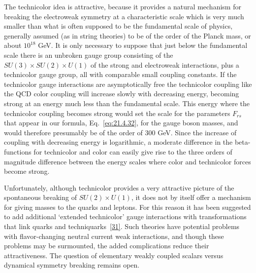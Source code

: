 The technicolor idea is attractive, because it provides a natural mechanism for breaking the electroweak symmetry at a characteristic scale which is very much smaller than what is often supposed to be the fundamental scale of physics, generally assumed (as in string theories) to be of the order of the Planck mass, or about $10^{18}$ GeV. It is only necessary to suppose that just below the fundamental scale there is an unbroken gauge group consisting of the $SU(3)\times SU(2)\times U(1)$ of the strong and electroweak interactions, plus a technicolor gauge group, all with comparable small coupling constants. If the technicolor gauge interactions are asymptotically free the technicolor coupling like the QCD color coupling will increase slowly with decreasing energy, becoming strong at an energy much less than the fundamental scale. This energy where the technicolor coupling becomes strong would set the scale for the parameters $F_{rs}$ that appear in our formula, Eq.~\eqref{eq:21.4.32}, for the gauge boson masses, and would therefore presumably be of the order of 300 GeV. Since the increase of coupling with decreasing energy is logarithmic, a moderate difference in the beta-functions for technicolor and color can easily give rise to the three orders of magnitude difference between the energy scales where color and technicolor forces become strong.

Unfortunately, although technicolor provides a very attractive picture of the spontaneous breaking of $SU(2)\times U(1)$, it does not by itself offer a mechanism for giving masses to the quarks and leptons. For this reason it has been suggested to add additional `extended technicolor' gauge interactions with transformations that link quarks and techniquarks~\hyperref[ch21-ref-31]{[31]}. Such theories have potential problems with flavor-changing neutral current weak interactions, and though these problems may be surmounted, the added complications reduce their attractiveness. The question of elementary weakly coupled scalars versus dynamical symmetry breaking remains open.
